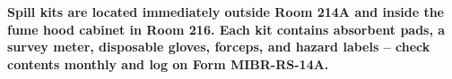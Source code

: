 \vspace{6pt}
\begin{tcolorbox}[colback=alertred,colframe=alertred,boxrule=0pt,arc=0pt,
  left=10pt,right=10pt,top=6pt,bottom=6pt]
\begin{minipage}[c]{1.6cm}
\centering
\resizebox{1.2cm}{!}{\Trefoil}
\end{minipage}%
\begin{minipage}[c]{0.82\linewidth}
{\color{white}\small\bfseries Spill kits are located immediately outside Room 214A and inside
the fume hood cabinet in Room 216. Each kit contains absorbent pads, a survey meter, disposable
gloves, forceps, and hazard labels -- check contents monthly and log on Form MIBR-RS-14A.}
\end{minipage}
\end{tcolorbox}
